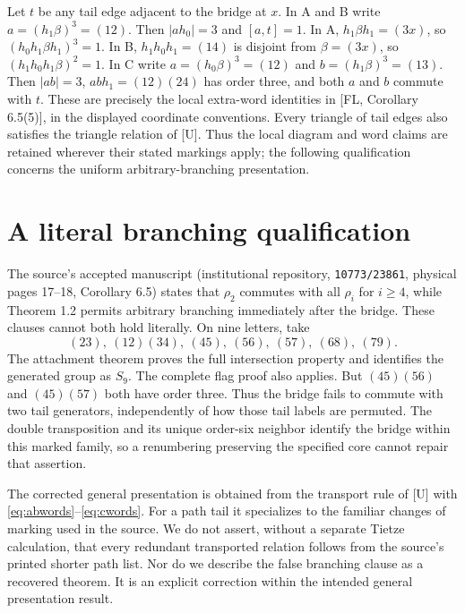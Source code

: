 Let $t$ be any tail edge adjacent to the bridge at $x$. In A and B
write $a=(h_1\beta)^3=(12)$. Then $|ah_0|=3$ and $[a,t]=1$.
In A, $h_1\beta h_1=(3x)$, so $(h_0h_1\beta h_1)^3=1$.
In B, $h_1h_0h_1=(14)$ is disjoint from $\beta=(3x)$, so
$(h_1h_0h_1\beta)^2=1$. In C write
$a=(h_0\beta)^3=(12)$ and $b=(h_1\beta)^3=(13)$.
Then $|ab|=3$, $abh_1=(12)(24)$ has order three, and both
$a$ and $b$ commute with $t$. These are precisely the local
extra-word identities in [FL, Corollary 6.5(5)], in the displayed
coordinate conventions. Every triangle of tail edges also satisfies
the triangle relation of [U]. Thus the local diagram and word claims
are retained wherever their stated markings apply; the following
qualification concerns the uniform arbitrary-branching presentation.

\section{A literal branching qualification}
The source's accepted manuscript (institutional repository,
\texttt{10773/23861}, physical pages 17--18, Corollary 6.5) states
that $\rho_2$ commutes with all $\rho_i$ for $i\geq4$, while
Theorem 1.2 permits arbitrary branching immediately after the bridge.
These clauses cannot both hold literally. On nine letters, take
\begin{equation}\label{eq:branchingexample}
 (23),\ (12)(34),\ (45),\ (56),\ (57),\ (68),\ (79).
                                                               \end{equation}
The attachment theorem proves the full intersection property and
identifies the generated group as $S_9$. The complete flag proof also
applies. But $(45)(56)$ and $(45)(57)$ both have order three. Thus
the bridge fails to commute with two tail generators, independently
of how those tail labels are permuted. The double transposition and
its unique order-six neighbor identify the bridge within this marked
family, so a renumbering preserving the specified core cannot repair
that assertion.

The corrected general presentation is obtained from the transport
rule of [U] with \eqref{eq:abwords}--\eqref{eq:cwords}. For a path tail it specializes to the familiar changes of
marking used in the source. We do not assert, without a separate
Tietze calculation, that every redundant transported relation follows from
the source's printed shorter path list. Nor do we describe the false
branching clause as a recovered theorem. It is an explicit correction
within the intended general presentation result.

